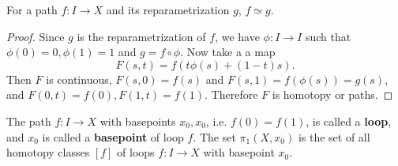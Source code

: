 \begin{lemma} For a path $f:I\rightarrow X$ and its reparametrization $g$, $f\simeq g$.
\end{lemma}
\begin{proof} Since $g$ is the reparametrization of $f$, we have $\phi:I\rightarrow I$ such that $\phi(0)=0,\phi(1)=1$ and $g=f\circ \phi$. Now take a a map
\begin{equation}
F(s,t)=f(t\phi(s)+(1-t)s).
\end{equation}
Then $F$ is continuous, $F(s,0)=f(s)$ and $F(s,1)=f(\phi(s))=g(s)$, and $F(0,t)=f(0), F(1,t)=f(1)$. Therefore $F$ is homotopy or paths.
\end{proof}

\begin{defn} The path $f:I\rightarrow X$ with basepoints $x_0,x_0$, i.e. $f(0)=f(1)$, is called a \textbf{loop}, and $x_0$ is called a \textbf{basepoint} of loop $f$. The set $\pi_1(X,x_0)$ is the set of all homotopy classes $[f]$ of loops $f:I\rightarrow X$ with basepoint $x_0$.
\end{defn}

